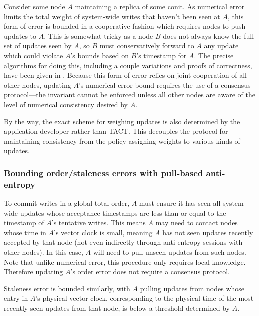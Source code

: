 Consider some node $A$ maintaining a replica of some conit. As numerical error
limits the total weight of system-wide writes that haven't been seen at $A$,
this form of error is bounded in a cooperative fashion which requires nodes to
push updates to $A$. This is somewhat tricky as a node $B$ does not always know
the full set of updates seen by $A$, so $B$ must conservatively forward to $A$
any update which could violate $A$'s bounds based on $B$'s timestamp for $A$.
The precise algorithms for doing this, including a couple variations and proofs
of correctness, have been given in \cite{2000tactalgorithms}. Because this form
of error relies on joint cooperation of all other nodes, updating $A$'s
numerical error bound requires the use of a consensus protocol---the invariant
cannot be enforced unless all other nodes are aware of the level of numerical
consistency desired by $A$.

By the way, the exact scheme for weighing updates is also determined by the
application developer rather than TACT. This decouples the protocol for
maintaining consistency from the policy assigning weights to various kinds of
updates.

\subsubsection{Bounding order/staleness errors with pull-based anti-entropy}

To commit writes in a global total order, $A$ must ensure it has seen all
system-wide updates whose acceptance timestamps are less than or equal to the
timestamp of $A$'s tentative writes. This means $A$ may need to contact nodes
whose time in $A$'s vector clock is small, meaning $A$ has not seen updates
recently accepted by that node (not even indirectly through anti-entropy
sessions with other nodes). In this case, $A$ will need to pull unseen updates
from such nodes. Note that unlike numerical error, this procedure only requires
local knowledge. Therefore updating $A$'s order error does not require a
consensus protocol.

Staleness error is bounded similarly, with $A$ pulling updates from nodes whose
entry in $A$'s physical vector clock, corresponding to the physical time of the
most recently seen updates from that node, is below a threshold determined by
$A$.

